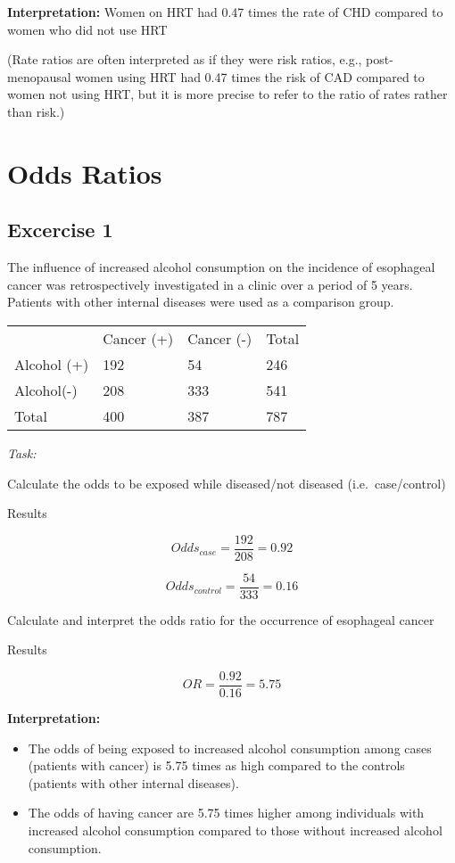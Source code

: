 \documentclass[
  letterpaper,
  paper=6in:9in,
  pagesize=pdftex,
  headinclude=on,
  footinclude=on,
  12pt]{scrbook}
\begin{document}
\textbf{Interpretation:} Women on HRT had 0.47 times the rate of CHD
compared to women who did not use HRT

(Rate ratios are often interpreted as if they were risk ratios, e.g.,
post-menopausal women using HRT had 0.47 times the risk of CAD compared
to women not using HRT, but it is more precise to refer to the ratio of
rates rather than risk.)

\hypertarget{odds-ratios}{%
\section{Odds Ratios}\label{odds-ratios}}

\hypertarget{excercise-1-1}{%
\subsection{Excercise 1}\label{excercise-1-1}}

The influence of increased alcohol consumption on the incidence of
esophageal cancer was retrospectively investigated in a clinic over a
period of 5 years. Patients with other internal diseases were used as a
comparison group.

\begin{longtable}[]{@{}llll@{}}
\toprule\noalign{}
\endhead
\bottomrule\noalign{}
\endlastfoot
& Cancer (+) & Cancer (-) & Total \\
Alcohol (+) & 192 & 54 & 246 \\
Alcohol(-) & 208 & 333 & 541 \\
Total & 400 & 387 & 787 \\
\end{longtable}

\emph{Task:}

Calculate the odds to be exposed while diseased/not diseased
(i.e.~case/control)

Results

\[
Odds_{case} = \frac{192}{208} = 0.92
\]

\[
Odds_{control} = \frac{54}{333} = 0.16
\]

Calculate and interpret the odds ratio for the occurrence of esophageal
cancer

Results

\[
OR = \frac{0.92}{0.16} = 5.75
\]

\textbf{Interpretation:}

\begin{itemize}
\item
  The odds of being exposed to increased alcohol consumption among cases
  (patients with cancer) is 5.75 times as high compared to the controls
  (patients with other internal diseases).
\item
  The odds of having cancer are 5.75 times higher among individuals with
  increased alcohol consumption compared to those without increased
  alcohol consumption.
\end{itemize}
\end{document}
